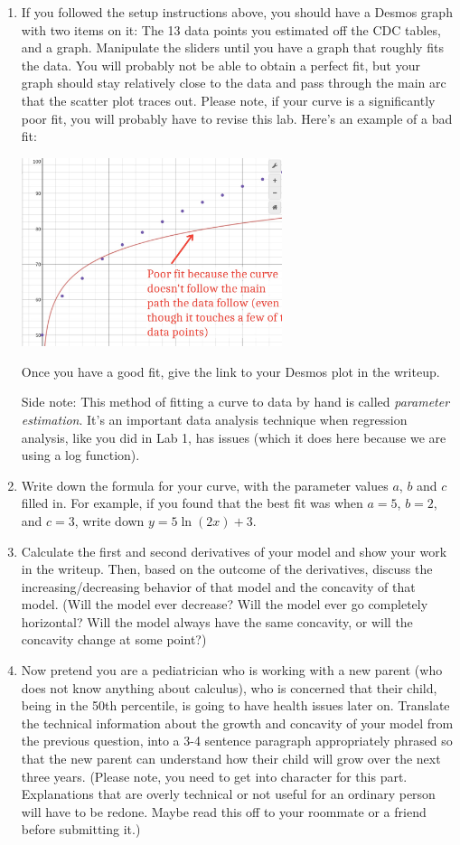 \documentclass[11pt,letterpaper]{article}
\begin{document}
\begin{enumerate}
    \item If you followed the setup instructions above, you should have a Desmos graph with two items on it: The 13 data points you estimated off the CDC tables, and a graph. Manipulate the sliders until you have a graph that roughly fits the data. You will probably not be able to obtain a perfect fit, but your graph should stay relatively close to the data and pass through the main arc that the scatter plot traces out. Please note, if your curve is a significantly poor fit, you will probably have to revise this lab. Here's an example of a bad fit: 
    	\begin{center}
	    \includegraphics[width=3in]{desmos-lab5-2.jpg}
	\end{center}
	Once you have a good fit, give the link to your Desmos plot in the writeup. 
	
	Side note: This method of fitting a curve to data by hand is called \emph{parameter estimation}. It's an important data analysis technique when regression analysis, like you did in Lab 1, has issues (which it does here because we are using a log function). 
	
	\item Write down the formula for your curve, with the parameter values $a$, $b$ and $c$ filled in. For example, if you found that the best fit was when $a = 5$, $b=2$, and $c=3$, write down $y = 5 \ln (2x) + 3$. 
	
	\item Calculate the first and second derivatives of your model and show your work in the writeup. Then, based on the outcome of the derivatives, discuss the increasing/decreasing behavior of that model and the concavity of that model. (Will the model ever decrease? Will the model ever go completely horizontal? Will the model always have the same concavity, or will the concavity change at some point?) 

	\item Now pretend you are a pediatrician who is working with a new parent (who does not know anything about calculus), who is concerned that their child, being in the 50th percentile, is going to have health issues later on. Translate the technical information about the growth and concavity of your model from the previous question, into a 3-4 sentence paragraph appropriately phrased so that the new parent can understand how their child will grow over the next three years. (Please note, you need to get into character for this part. Explanations that are overly technical or not useful for an ordinary person will have to be redone. Maybe read this off to your roommate or a friend before submitting it.) 


\end{enumerate}
\end{document}
